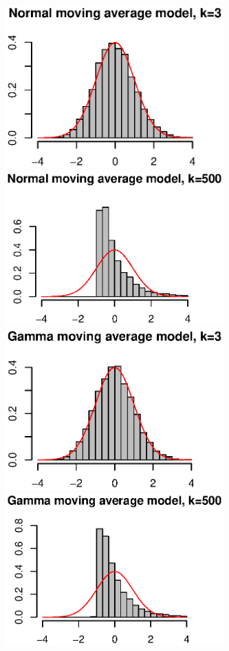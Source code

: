 \documentclass[smallcondensed,final,natbib]{svjour3}          %
\begin{document}
\begin{figure}[htbp]
    \centering
    \includegraphics[width=84mm]{Fig2}
    \includegraphics[width=84mm]{Fig3}\\
    \includegraphics[width=84mm]{Fig4}
    \includegraphics[width=84mm]{Fig5}\\

\end{figure}
\end{document}
